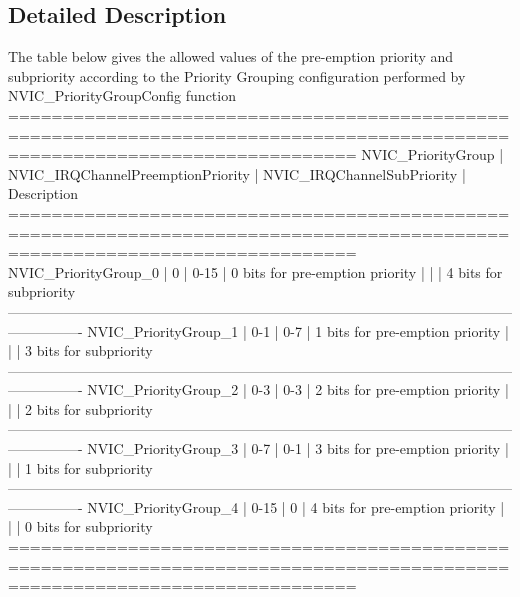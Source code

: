 \subsection{Detailed Description}
\begin{DoxyVerb} The table below gives the allowed values of the pre-emption priority and subpriority according
 to the Priority Grouping configuration performed by NVIC_PriorityGroupConfig function
  ============================================================================================================================
    NVIC_PriorityGroup   | NVIC_IRQChannelPreemptionPriority | NVIC_IRQChannelSubPriority  | Description
  ============================================================================================================================
   NVIC_PriorityGroup_0  |                0                  |            0-15             |   0 bits for pre-emption priority
                         |                                   |                             |   4 bits for subpriority
  ----------------------------------------------------------------------------------------------------------------------------
   NVIC_PriorityGroup_1  |                0-1                |            0-7              |   1 bits for pre-emption priority
                         |                                   |                             |   3 bits for subpriority
  ----------------------------------------------------------------------------------------------------------------------------    
   NVIC_PriorityGroup_2  |                0-3                |            0-3              |   2 bits for pre-emption priority
                         |                                   |                             |   2 bits for subpriority
  ----------------------------------------------------------------------------------------------------------------------------    
   NVIC_PriorityGroup_3  |                0-7                |            0-1              |   3 bits for pre-emption priority
                         |                                   |                             |   1 bits for subpriority
  ----------------------------------------------------------------------------------------------------------------------------    
   NVIC_PriorityGroup_4  |                0-15               |            0                |   4 bits for pre-emption priority
                         |                                   |                             |   0 bits for subpriority                       
  ============================================================================================================================
\end{DoxyVerb}
 